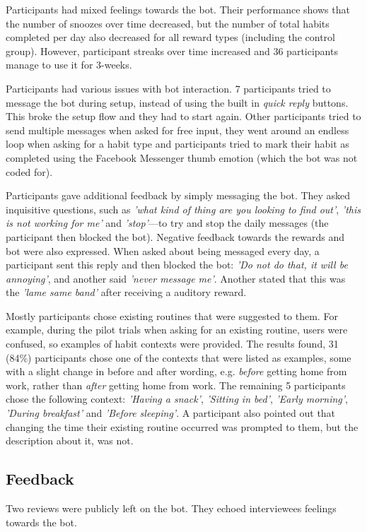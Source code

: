 Participants had mixed feelings towards the bot. Their performance shows that the number of snoozes over time decreased, but the number of total habits completed per day also decreased for all reward types (including the control group). However, participant streaks over time increased and 36 participants manage to use it for 3-weeks.

Participants had various issues with bot interaction. 7 participants tried to message the bot during setup, instead of using the built in \textit{quick reply} buttons. This broke the setup flow and they had to start again. Other participants tried to send multiple messages when asked for free input, they went around an endless loop when asking for a habit type and participants tried to mark their habit as completed using the Facebook Messenger thumb emotion (which the bot was not coded for).

Participants gave additional feedback by simply messaging the bot. They asked inquisitive questions, such as \textit{'what kind of thing are you looking to find out'}, \textit{'this is not working for me'} and \textit{'stop'}---to try and stop the daily messages (the participant then blocked the bot). Negative feedback towards the rewards and bot were also expressed. When asked about being messaged every day, a participant sent this reply and then blocked the bot: \textit{'Do not do that, it will be annoying'}, and another said \textit{'never message me'}. Another stated that this was the \textit{'lame same band'} after receiving a auditory reward.

Mostly participants chose existing routines that were suggested to them. For example, during the pilot trials when asking for an existing routine, users were confused, so examples of habit contexts were provided. The results found, 31 (84\%) participants chose one of the contexts that were listed as examples, some with a slight change in before and after wording, e.g. \textit{before} getting home from work, rather than \textit{after} getting home from work. The remaining 5 participants chose the following context: \textit{'Having a snack'}, \textit{'Sitting in bed'}, \textit{'Early morning'}, \textit{'During breakfast'} and \textit{'Before sleeping'}. A participant also pointed out that changing the time their existing routine occurred was prompted to them, but the description about it, was not.


\subsection*{Feedback}
Two reviews were publicly left on the bot. They echoed interviewees feelings towards the bot.

